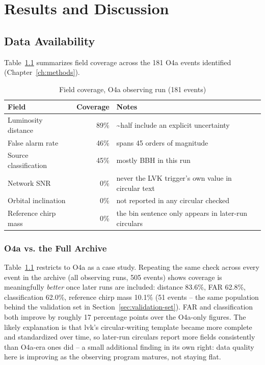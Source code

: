 \chapter{Results and Discussion}
\label{ch:results}

\section{Data Availability}

Table~\ref{tab:availability} summarizes field coverage across the 181 O4a events identified (Chapter~\ref{ch:methods}).

\begin{table}[H]
\centering
\caption{Field coverage, O4a observing run (181 events)}
\label{tab:availability}
\begin{tabular}{@{}lrl@{}}
\toprule
Field & Coverage & Notes \\
\midrule
Luminosity distance & 89\% & \textasciitilde half include an explicit uncertainty \\
False alarm rate & 46\% & spans 45 orders of magnitude \\
Source classification & 45\% & mostly BBH in this run \\
Network SNR & 0\% & never the LVK trigger's own value in circular text \\
Orbital inclination & 0\% & not reported in any circular checked \\
Reference chirp mass & 0\% & the bin sentence only appears in later-run circulars \\
\bottomrule
\end{tabular}
\end{table}

\subsection{O4a vs. the Full Archive}

Table~\ref{tab:availability} restricts to O4a as a case study. Repeating the same check across every event in the archive (all observing runs, 505 events) shows coverage is meaningfully \emph{better} once later runs are included: distance 83.6\%, FAR 62.8\%, classification 62.0\%, reference chirp mass 10.1\% (51 events -- the same population behind the validation set in Section~\ref{sec:validation-set}). FAR and classification both improve by roughly 17 percentage points over the O4a-only figures. The likely explanation is that \gls{lvk}'s circular-writing template became more complete and standardized over time, so later-run circulars report more fields consistently than O4a-era ones did -- a small additional finding in its own right: data quality here is improving as the observing program matures, not staying flat.

